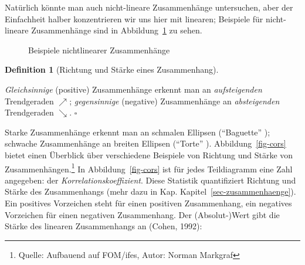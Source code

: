 \documentclass[
  letterpaper,
  oneside,
  open=any]{scrbook}
\theoremstyle{definition}
\theoremstyle{definition}
\theoremstyle{definition}
\newtheorem{definition}{Definition}[chapter]
\theoremstyle{remark}
\begin{document}
Natürlich könnte man auch nicht-lineare Zusammenhänge untersuchen, aber
der Einfachheit halber konzentrieren wir uns hier mit linearen;
Beispiele für nicht-lineare Zusammenhänge sind in
Abbildung~\ref{fig-nonlinear} zu sehen.

\begin{figure}


\caption{\label{fig-nonlinear}Beispiele nichtlinearer Zusammenhänge}

\end{figure}%

\begin{definition}[Richtung und Stärke eines
Zusammenhang]\protect\hypertarget{def-zshg}{}\label{def-zshg}

\emph{Gleichsinnige} (positive) Zusammenhänge erkennt man an
\emph{aufsteigenden} Trendgeraden \(\nearrow\); \emph{gegensinnige}
(negative) Zusammenhänge an \emph{absteigenden} Trendgeraden
\(\searrow\). \(\square\)

\end{definition}

Starke Zusammenhänge erkennt man an schmalen Ellipsen
(\enquote{Baguette} ); schwache Zusammenhänge an breiten Ellipsen
(\enquote{Torte} ). Abbildung~\ref{fig-cors} bietet einen Überblick über
verschiedene Beispiele von Richtung und Stärke von
Zusammenhängen.\footnote{Quelle: Aufbauend auf FOM/ifes, Autor: Norman
  Markgraf} In Abbildung~\ref{fig-cors} ist für jedes Teildiagramm eine
Zahl angegeben: der \emph{Korrelationskoeffizient}. Diese Statistik
quantifiziert Richtung und Stärke des Zusammenhangs (mehr dazu in Kap.
Kapitel~\ref{sec-zusammenhaenge}). Ein positives Vorzeichen steht für
einen positiven Zusammenhang, ein negatives Vorzeichen für einen
negativen Zusammenhang. Der (Absolut-)Wert gibt die Stärke des linearen
Zusammenhangs an (Cohen, 1992):
\end{document}
